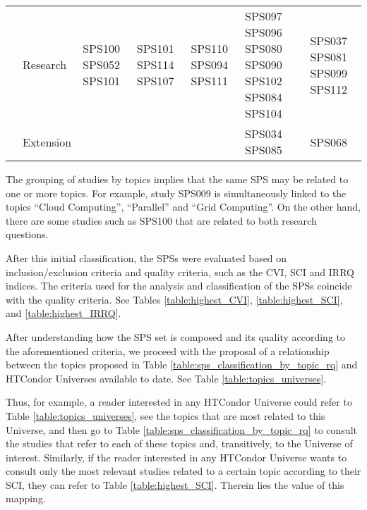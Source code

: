 \begin{table*}[htbp]
\begin{tabularx}{\textwidth}{p{0.8cm}p{2.5cm}>{\raggedright\arraybackslash}X>{\raggedright\arraybackslash}X>{\raggedright\arraybackslash}X>{\raggedright\arraybackslash}X>{\raggedright\arraybackslash}X}
		\addlinespace[0.3em]
		                                      & Research                & SPS100 SPS052 SPS101                                    & SPS101 SPS114 SPS107                                                                                                          & SPS110 SPS094 SPS111                                                                       & SPS097 SPS096 SPS080 SPS090 SPS102 SPS084 SPS104                                    & SPS037 SPS081 SPS099 SPS112        \\
		\addlinespace[0.3em]
		                                      & Extension               &                                                         &                                                                                                                               &                                                                                            & SPS034 SPS085                                                                       & SPS068                             \\
		\bottomrule
	\end{tabularx}
\end{table*}

The grouping of studies by topics implies that the same SPS may be related to one or more topics. For example, study SPS009 is simultaneously linked to the topics ``Cloud Computing'', ``Parallel'' and ``Grid Computing''. On the other hand, there are some studies such as SPS100 that are related to both research questions.

After this initial classification, the SPSs were evaluated based on inclusion/exclusion criteria and quality criteria, such as the CVI, SCI and IRRQ indices. The criteria used for the analysis and classification of the SPSs coincide with the quality criteria. See Tables \ref{table:highest_CVI}, \ref{table:highest_SCI}, and \ref{table:highest_IRRQ}.

After understanding how the SPS set is composed and its quality according to the aforementioned criteria, we proceed with the proposal of a relationship between the topics proposed in Table \ref{table:sps_classification_by_topic_rq} and HTCondor Universes available to date. See Table \ref{table:topics_universes}.

Thus, for example, a reader interested in any HTCondor Universe could refer to Table \ref{table:topics_universes}, see the topics that are most related to this Universe, and then go to Table \ref{table:sps_classification_by_topic_rq} to consult the studies that refer to each of these topics and, transitively, to the Universe of interest. Similarly, if the reader interested in any HTCondor Universe wants to consult only the most relevant studies related to a certain topic according to their SCI, they can refer to Table \ref{table:highest_SCI}. Therein lies the value of this mapping.

